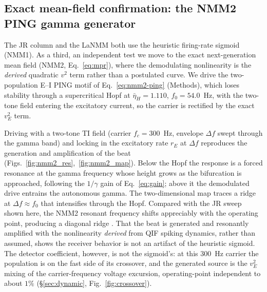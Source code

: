 \documentclass[11pt,a4paper]{article}
\providecommand{\DIFaddtex}[1]{{\protect\color{blue} \sf #1}} %
\providecommand{\DIFdeltex}[1]{{\protect\color{red} \scriptsize #1}} %
\providecommand{\DIFaddbegin}{} %
\providecommand{\DIFaddend}{} %
\providecommand{\DIFdelbegin}{} %
\providecommand{\DIFdelend}{} %
\providecommand{\DIFadd}[1]{\texorpdfstring{\DIFaddtex{#1}}{#1}} %
\providecommand{\DIFdel}[1]{\texorpdfstring{\DIFdeltex{#1}}{}} %
\begin{document}
\subsection{Exact mean-field confirmation: the NMM2 PING gamma generator}\label{sec:nmm2-results}
The JR column and the LaNMM both use the heuristic firing-rate sigmoid (NMM1). As \DIFdelbegin \DIFdel{a
third, }\DIFdelend \DIFaddbegin \DIFadd{an
}\DIFaddend independent test we move to the exact next-generation mean field (NMM2,
Eq.~\eqref{eq:mpr}), where the demodulating nonlinearity is the \emph{derived}
quadratic $v^2$ term rather than a postulated curve. We drive the two-population E--I PING motif of
Eq.~\eqref{eq:nmm2-ping} (Methods), which loses stability through a supercritical
Hopf at $\bar\eta_H=1.110$, $f_0=54.0$~Hz, with the two-tone field entering the
excitatory current,
so the carrier is rectified by the exact $v_E^2$ term.

Driving with a two-tone TI field (carrier $f_c=300$~Hz, envelope $\Delta f$ swept through
the gamma band) and locking in the excitatory rate $r_E$ at $\Delta f$ reproduces the
generation and amplification of the beat (Figs.~\ref{fig:nmm2_res},~\ref{fig:nmm2_map}). Below the Hopf the
response is a forced resonance at the gamma frequency whose height grows as the
bifurcation is approached, following the $1/\gamma$ gain of Eq.~\eqref{eq:gain}; above it the
demodulated drive entrains the autonomous gamma. The two-dimensional map traces a
ridge at $\Delta f\!\approx\!f_0$ that intensifies through the Hopf. Compared with the
JR sweep shown here, the NMM2 resonant frequency shifts appreciably with the
operating point, producing a diagonal ridge \cite{clusella2023}. That the beat is generated and resonantly amplified with the nonlinearity
\emph{derived} from QIF spiking dynamics, rather than assumed, shows the receiver behavior
is not an artifact of the heuristic sigmoid. The detector coefficient, however, is not the
sigmoid's: at this $300$~Hz carrier the population is on the fast side of its crossover,
and the generated source is the $v_E^2$ mixing of the carrier-frequency voltage excursion,
operating-point independent to about $1\%$ (\S\ref{sec:dynamic}, Fig.~\ref{fig:crossover}).
\end{document}
